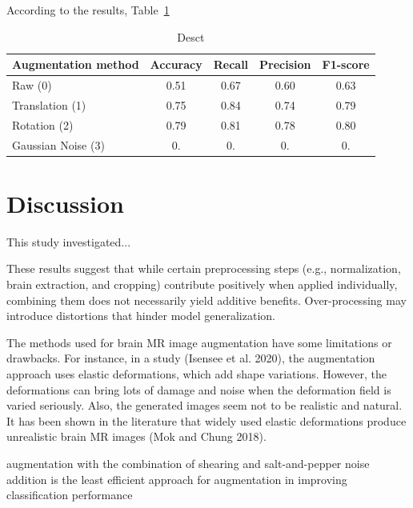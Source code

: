 According to the results, Table~\ref{tab:model_meetrics_augmentation}
\begin{center}
	\begin{table}[t]
		\centering
		\caption{\label{tab:model_meetrics_augmentation}Desct}
		\begin{tabular*}{500pt}{@{\extracolsep\fill}lcccc@{\extracolsep\fill}}
			\toprule
			\textbf{Augmentation method} &\textbf{Accuracy} &  \textbf{Recall} &\textbf{Precision} &\textbf{F1-score}\\
			\midrule
			Raw (0) & 0.51 & 0.67 & 0.60 & 0.63 \\
			Translation (1) & 0.75 & 0.84 & 0.74 & 0.79 \\
			Rotation (2) & 0.79 & 0.81 & 0.78 & 0.80 \\
			Gaussian Noise (3) & 0. & 0. & 0. & 0. \\
			\bottomrule
		\end{tabular*}
	\end{table}
\end{center}

\section{Discussion}

This study investigated...

These results suggest that while certain preprocessing steps (e.g., normalization, brain extraction, and cropping) contribute positively when applied individually, combining them does not necessarily yield additive benefits. Over-processing may introduce distortions that hinder model generalization.

The methods used for brain MR image augmentation have some limitations or drawbacks. For instance, in a study (Isensee et al. 2020), the augmentation approach uses elastic deformations, which add shape variations. However, the deformations can bring lots of damage and noise when the deformation field is varied seriously. Also, the generated images seem not to be realistic and natural. It has been shown in the literature that widely used elastic deformations produce unrealistic brain MR images (Mok and Chung 2018).

augmentation with the combination of shearing and salt-and-pepper noise addition is the least efficient approach for augmentation in improving classification performance 


